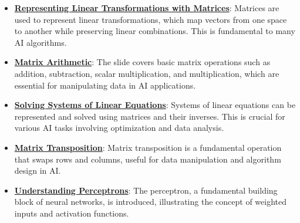 \documentclass{article}%
\begin{document}
\begin{itemize}[leftmargin=*]%
\item \href{https://purdue.brightspace.com/d2l/common/assets/pdfjs-d2l-dist/1.0.14-legacy/web/viewer.html?file=%2Fcontent%2Fenforced%2F1095467-wl.202510.CS.24300.001%2F04L1-Linear Algebra Primer.pdf%3Fou%3D1095467&lang=en-us&container=d2l-fileviewer-rendered-pdf&fullscreen=d2l-fileviewer-rendered-pdf-dialog&height=667#page=5}{\textbf{Representing Linear Transformations with Matrices}}: Matrices are used to represent linear transformations, which map vectors from one space to another while preserving linear combinations. This is fundamental to many AI algorithms.%
\item \href{https://purdue.brightspace.com/d2l/common/assets/pdfjs-d2l-dist/1.0.14-legacy/web/viewer.html?file=%2Fcontent%2Fenforced%2F1095467-wl.202510.CS.24300.001%2F04L1-Linear Algebra Primer.pdf%3Fou%3D1095467&lang=en-us&container=d2l-fileviewer-rendered-pdf&fullscreen=d2l-fileviewer-rendered-pdf-dialog&height=667#page=9}{\textbf{Matrix Arithmetic}}: The slide covers basic matrix operations such as addition, subtraction, scalar multiplication, and multiplication, which are essential for manipulating data in AI applications.%
\item \href{https://purdue.brightspace.com/d2l/common/assets/pdfjs-d2l-dist/1.0.14-legacy/web/viewer.html?file=%2Fcontent%2Fenforced%2F1095467-wl.202510.CS.24300.001%2F04L1-Linear Algebra Primer.pdf%3Fou%3D1095467&lang=en-us&container=d2l-fileviewer-rendered-pdf&fullscreen=d2l-fileviewer-rendered-pdf-dialog&height=667#page=11}{\textbf{Solving Systems of Linear Equations}}: Systems of linear equations can be represented and solved using matrices and their inverses. This is crucial for various AI tasks involving optimization and data analysis.%
\item \href{https://purdue.brightspace.com/d2l/common/assets/pdfjs-d2l-dist/1.0.14-legacy/web/viewer.html?file=%2Fcontent%2Fenforced%2F1095467-wl.202510.CS.24300.001%2F04L1-Linear Algebra Primer.pdf%3Fou%3D1095467&lang=en-us&container=d2l-fileviewer-rendered-pdf&fullscreen=d2l-fileviewer-rendered-pdf-dialog&height=667#page=16}{\textbf{Matrix Transposition}}: Matrix transposition is a fundamental operation that swaps rows and columns, useful for data manipulation and algorithm design in AI.%
\item \href{https://purdue.brightspace.com/d2l/common/assets/pdfjs-d2l-dist/1.0.14-legacy/web/viewer.html?file=%2Fcontent%2Fenforced%2F1095467-wl.202510.CS.24300.001%2F04L1-Linear Algebra Primer.pdf%3Fou%3D1095467&lang=en-us&container=d2l-fileviewer-rendered-pdf&fullscreen=d2l-fileviewer-rendered-pdf-dialog&height=667#page=17}{\textbf{Understanding Perceptrons}}: The perceptron, a fundamental building block of neural networks, is introduced, illustrating the concept of weighted inputs and activation functions.%

\end{itemize}
\end{document}
